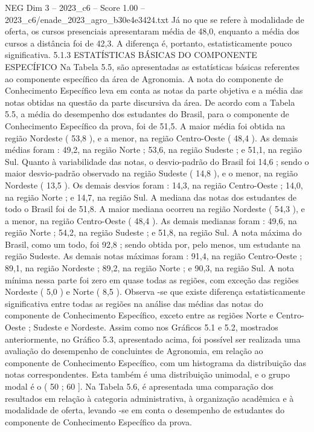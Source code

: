 \begin{textsample}{NEG Dim 3 – 2023\_c6 – Score 1.00 – 2023\_c6/enade\_2023\_agro\_b30e4e3424.txt}
Já no que se refere à modalidade de oferta, os cursos presenciais apresentaram média de 48,0, enquanto a média dos cursos a distância foi de 42,3.
A diferença é, portanto, estatisticamente pouco significativa. 5.1.3 ESTATÍSTICAS BÁSICAS DO COMPONENTE ESPECÍFICO Na Tabela 5.5, são apresentadas as estatísticas básicas referentes ao componente específico da área de Agronomia.
A nota do componente de Conhecimento Específico leva em conta as notas da parte objetiva e a média das notas obtidas na questão da parte discursiva da área.
De acordo com a Tabela 5.5, a média do desempenho dos estudantes do Brasil, para o componente de Conhecimento Específico da prova, foi de 51,5.
A maior média foi obtida na região Nordeste ( 53,8 ), e a menor, na região Centro-Oeste ( 48,4 ).
As demais médias foram : 49,2, na região Norte ; 53,6, na região Sudeste ; e 51,1, na região Sul.
Quanto à variabilidade das notas, o desvio-padrão do Brasil foi 14,6 ; sendo o maior desvio-padrão observado na região Sudeste ( 14,8 ), e o menor, na região Nordeste ( 13,5 ).
Os demais desvios foram : 14,3, na região Centro-Oeste ; 14,0, na região Norte ; e 14,7, na região Sul.
A mediana das notas dos estudantes de todo o Brasil foi de 51,8.
A maior mediana ocorreu na região Nordeste ( 54,3 ), e a menor, na região Centro-Oeste ( 48,4 ).
As demais medianas foram : 49,6, na região Norte ; 54,2, na região Sudeste ; e 51,8, na região Sul.
A nota máxima do Brasil, como um todo, foi 92,8 ; sendo obtida por, pelo menos, um estudante na região Sudeste.
As demais notas máximas foram : 91,4, na região Centro-Oeste ; 89,1, na região Nordeste ; 89,2, na região Norte ; e 90,3, na região Sul.
A nota mínima nessa parte foi zero em quase todas as regiões, com exceção das regiões Nordeste ( 5,0 ) e Norte ( 8,5 ).
Observa -se que existe diferença estatisticamente significativa entre todas as regiões na análise das médias das notas do componente de Conhecimento Específico, exceto entre as regiões Norte e Centro-Oeste ; Sudeste e Nordeste.
Assim como nos Gráficos 5.1 e 5.2, mostrados anteriormente, no Gráfico 5.3, apresentado acima, foi possível ser realizada uma avaliação do desempenho de concluintes de Agronomia, em relação ao componente de Conhecimento Específico, com um histograma da distribuição das notas correspondentes.
Esta também é uma distribuição unimodal, e o grupo modal é o ( 50 ; 60 ].
Na Tabela 5.6, é apresentada uma comparação dos resultados em relação à categoria administrativa, à organização acadêmica e à modalidade de oferta, levando -se em conta o desempenho de estudantes do componente de Conhecimento Específico da prova.

\end{textsample}
